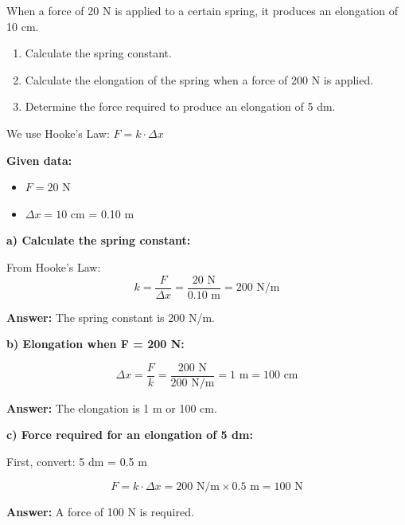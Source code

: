 \begin{exercise}
    When a force of 20 N is applied to a certain spring, it produces an elongation of 10 cm.
    \begin{enumerate}[label=\alph*)]
        \item Calculate the spring constant.
        \item Calculate the elongation of the spring when a force of 200 N is applied.
        \item Determine the force required to produce an elongation of 5 dm.
    \end{enumerate}

    \begin{solu}
        We use Hooke's Law: $F = k \cdot \Delta x$

        \textbf{Given data:}
        \begin{itemize}
            \item $F = 20$ N
            \item $\Delta x = 10$ cm = 0.10 m
        \end{itemize}

        \textbf{a) Calculate the spring constant:}

        From Hooke's Law:
        $$k = \frac{F}{\Delta x} = \frac{20\text{ N}}{0.10\text{ m}} = 200\text{ N/m}$$

        \textbf{Answer:} The spring constant is 200 N/m.

        \textbf{b) Elongation when F = 200 N:}

        $$\Delta x = \frac{F}{k} = \frac{200\text{ N}}{200\text{ N/m}} = 1\text{ m} = 100\text{ cm}$$

        \textbf{Answer:} The elongation is 1 m or 100 cm.

        \textbf{c) Force required for an elongation of 5 dm:}

        First, convert: 5 dm = 0.5 m

        $$F = k \cdot \Delta x = 200\text{ N/m} \times 0.5\text{ m} = 100\text{ N}$$

        \textbf{Answer:} A force of 100 N is required.
    \end{solu}
\end{exercise}

